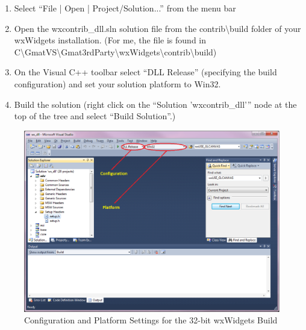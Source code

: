 \documentclass[letterpaper,10pt]{article}%
\begin{document}
\begin{enumerate}
\item Select ``File | Open | Project/Solution...'' from the menu bar
\item Open the wxcontrib\_dll.sln solution file from the contrib\textbackslash build folder of your wxWidgets installation.  (For me, the file is found in  C\:\textbackslash GmatVS\textbackslash Gmat3rdParty\textbackslash wxWidgets\textbackslash contrib\textbackslash build)
\item On the Visual C++ toolbar select ``DLL Release'' (specifying the build configuration) and set your solution platform to Win32.  
\item Build the solution (right click on the ``Solution 'wxcontrib\_dll'{}'' node at the top of the tree and select ``Build Solution''.)
\end{enumerate}

\begin{figure}
\centering
\includegraphics[scale=0.6]{DLLRelease.eps}
\caption{Configuration and Platform Settings for the 32-bit wxWidgets Build}
\label{fig:wxSettings}
\end{figure}
\end{document}
